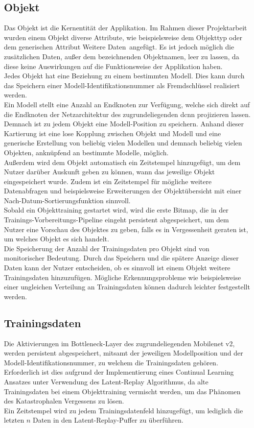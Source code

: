 \documentclass[oneside]{ausarbeitung}
\begin{document}
\subsection{Objekt}
Das Objekt ist die Kernentität der Applikation. Im Rahmen dieser Projektarbeit wurden einem Objekt diverse Attribute, wie beispielsweise dem Objekttyp oder dem generischen Attribut \glqq Weitere Daten\grqq\ angefügt. Es ist jedoch möglich die zusätzlichen Daten, außer dem bezeichnenden Objektnamen, leer zu lassen, da diese keine Auswirkungen auf die Funktionsweise der Applikation haben.\\
Jedes Objekt hat eine Beziehung zu einem bestimmten Modell. Dies kann durch das Speichern einer Modell-Identifikationsnummer als Fremdschlüssel realisiert werden.\\
Ein Modell stellt eine Anzahl an Endknoten zur Verfügung, welche sich direkt auf die Endknoten der Netzarchitektur des zugrundeliegenden \ac{dcnn} projizieren lassen. Demnach ist zu jedem Objekt eine Modell-Position zu speichern. Anhand dieser Kartierung ist eine lose Kopplung zwischen Objekt und Modell und eine generische Erstellung von beliebig vielen Modellen und demnach beliebig vielen Objekten, anknüpfend an bestimmte Modelle, möglich.\\ 
Außerdem wird dem Objekt automatisch ein Zeitstempel hinzugefügt, um dem Nutzer darüber Auskunft geben zu können, wann das jeweilige Objekt eingespeichert wurde. Zudem ist ein Zeitstempel für mögliche weitere Datenabfragen und beispielsweise Erweiterungen der Objektübersicht mit einer Nach-Datum-Sortierungsfunktion sinnvoll.\\
Sobald ein Objekttraining gestartet wird, wird die erste Bitmap, die in der Trainings-Vorbereitungs-Pipeline eingeht persistent abgespeichert, um dem Nutzer eine Vorschau des Objektes zu geben, falls es in Vergessenheit geraten ist, um welches Objekt es sich handelt.\\
Die Speicherung der Anzahl der Trainingsdaten pro Objekt sind von monitorischer Bedeutung. Durch das Speichern und die spätere Anzeige dieser Daten kann der Nutzer entscheiden, ob es sinnvoll ist einem Objekt weitere Trainingsdaten hinzuzufügen. Mögliche Erkennungsprobleme wie beispielsweise einer ungleichen Verteilung an Trainingsdaten können dadurch leichter festgestellt werden.\\
\subsection{Trainingsdaten}
Die Aktivierungen im Bottleneck-Layer des zugrundeliegenden Mobilenet v2, werden persistent abgespeichert, mitsamt der jeweiligen Modellposition und der Modell-Identifikationsnummer, zu welchem die Trainingsdaten gehören. Erforderlich ist dies aufgrund der Implementierung eines Continual Learning Ansatzes unter Verwendung des Latent-Replay Algorithmus, da alte Trainingsdaten bei einem Objekttraining vermischt werden, um das Phänomen des Katastrophalen Vergessens zu lösen.\\
Ein Zeitstempel wird zu jedem Trainingsdatenfeld hinzugefügt, um lediglich die letzten $n$ Daten in den Latent-Replay-Puffer zu überführen.
\end{document}

